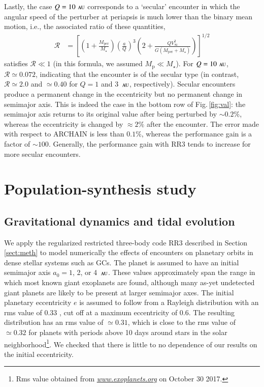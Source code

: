 \documentclass[iop,usenatbib]{emulateapj}
\renewcommand{\S}{Section}
\newcommand{\F}{Fig.}
\newcommand{\au}{\,\textsc{au}}
\newcommand{\mper}{M_\mathrm{per}}
\begin{document}
Lastly, the case $Q=10\,\au$ corresponds to a `secular' encounter in which the angular speed of the perturber at periapsis is much lower than the binary mean motion, i.e., the associated ratio of these quantities,
\begin{align}
\label{eq:R_def}
\mathcal{R} &= \left [ \left ( 1 + \frac{\mper}{M_\star} \right ) \left (\frac{a}{Q} \right )^3 \left ( 2 + \frac{Q V_\infty^2}{G(\mper + M_\star)} \right ) \right ]^{1/2}
\end{align}
satisfies $\mathcal{R} \ll 1$ (in this formula, we assumed $M_\mathrm{p} \ll M_\star$). For $Q=10\,\au$, $\mathcal{R} \simeq 0.072$, indicating that the encounter is of the secular type (in contrast, $\mathcal{R} \simeq 2.0$ and $\simeq0.40$ for $Q=1$ and 3 $\au$, respectively). Secular encounters produce a permanent change in the eccentricity but no permanent change in semimajor axis. This is indeed the case in the bottom row of \F\,\ref{fig:val}: the semimajor axis returns to its original value after being perturbed by $\sim0.2\%$, whereas the eccentricity is changed by $\approx 2\%$ after the encounter. The error made with respect to \textsc{ARCHAIN} is less than $0.1\%$, whereas the performance gain is a factor of $\sim 100$. Generally, the performance gain with \textsc{RR3} tends to increase for more secular encounters. 



\section{Population-synthesis study}
\label{sect:pop_syn}

\subsection{Gravitational dynamics and tidal evolution}
\label{sect:pop_syn:dyn}

We apply the regularized restricted three-body code \textsc{RR3} described in \S\,\ref{sect:meth} to model numerically the effects of encounters on planetary orbits in dense stellar systems such as GCs. The planet is assumed to have an initial semimajor axis $a_0=1$, 2, or 4 $\au$. These values approximately span the range in which most known giant exoplanets are found, although many as-yet undetected giant planets are likely to be present at larger semimajor axes. The initial planetary eccentricity $e$ is assumed to follow from a Rayleigh distribution with an rms value of 0.33 \citep{2008ApJ...686..603J}, cut off at a maximum eccentricity of 0.6. The resulting distribution has an rms value of $\simeq 0.31$, which is close to the rms value of $\simeq 0.32$ for planets with periods above 10 days around stars in the solar neighborhood\footnote{Rms value obtained from \href{www.exoplanets.org}{\it www.exoplanets.org} on October 30 2017.}. We  checked that there is little to no dependence of our results on the initial eccentricity.
\end{document}
